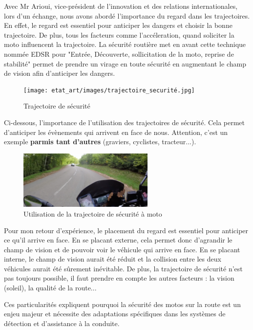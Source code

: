 Avec Mr Arioui, vice-président de l'innovation et des relations internationales, lors d'un échange, nous avons abordé l'importance du regard dans les trajectoires. En effet, le regard est essentiel pour anticiper les dangers et choisir la bonne trajectoire. De plus, tous les facteurs comme l'accéleration, quand soliciter la moto influencent la trajectoire. 
La sécurité routière\cite{trajectoire_securite} met en avant cette technique nommée EDSR pour "Entrée, Découverte, sollicitation de la moto, reprise de stabilité" permet de prendre un virage en toute sécurité en augmentant le champ de vision afin d'anticiper les dangers. 
\begin{figure}[H]
    \centering
    \texttt{[image: etat\_art/images/trajectoire\_securité.jpg]} 
    \caption{Trajectoire de sécurité}
\end{figure}
Ci-dessous, l'importance de l'utilisation des trajectoires de sécurité. Cela permet d'anticiper les évènements qui arrivent en face de nous. Attention, c'est un exemple \textbf{parmis tant d'autres} (graviers, cyclistes, tracteur...).
\begin{figure}[H]
    \centering
    \includegraphics[width=0.6\textwidth]{etat_art/images/morvan.png} 
    \caption{Utilisation de la trajectoire de sécurité à moto}
\end{figure}
Pour mon retour d'expérience, le placement du regard est essentiel pour anticiper ce qu'il arrive en face. En se placant externe, cela permet donc d'agrandir le champ de vision et de pouvoir voir le véhicule qui arrive en face. En se placant interne, le champ de vision aurait été réduit et la collision entre les deux véhicules aurait été sûrement inévitable. De plus, la trajectoire de sécurité n'est pas toujours possible, il faut prendre en compte les autres facteurs : la vision (soleil), la qualité de la route...

\vspace{0.5cm} %
Ces particularités expliquent pourquoi la sécurité des motos sur la route est un enjeu majeur et nécessite des adaptations spécifiques dans les systèmes de détection et d’assistance à la conduite. 

